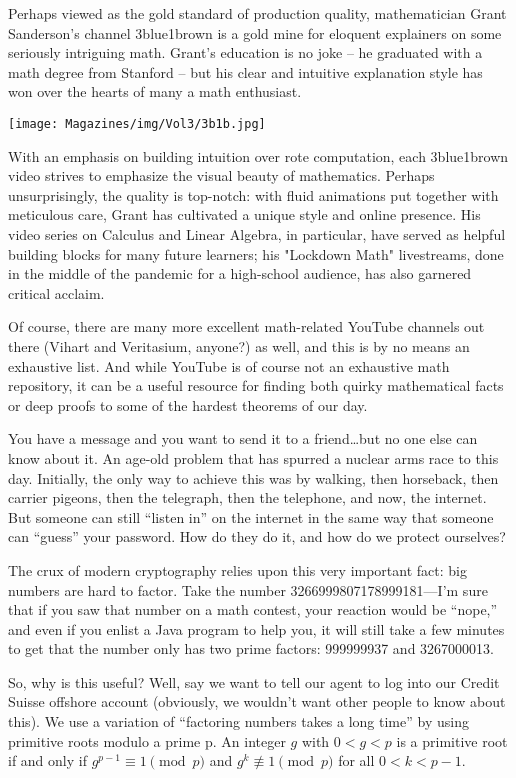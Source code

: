 \documentclass{article}
\begin{document}
\begin{multicols}{3}
Perhaps viewed as the gold standard of production quality, mathematician Grant Sanderson's channel 3blue1brown is a gold mine for eloquent explainers on some seriously intriguing math. Grant's education is no joke -- he graduated with a math degree from Stanford -- but his clear and intuitive explanation style has won over the hearts of many a math enthusiast. 
\begin{center}
\texttt{[image: Magazines/img/Vol3/3b1b.jpg]}
\end{center}
With an emphasis on building intuition over rote computation, each 3blue1brown video strives to emphasize the visual beauty of mathematics. Perhaps unsurprisingly, the quality is top-notch: with fluid animations put together with meticulous care, Grant has cultivated a unique style and online presence. His video series on Calculus and Linear Algebra, in particular, have served as helpful building blocks for many future learners; his "Lockdown Math" livestreams, done in the middle of the pandemic for a high-school audience, has also garnered critical acclaim. 

Of course, there are many more excellent math-related YouTube channels out there (Vihart and Veritasium, anyone?) as well, and this is by no means an exhaustive list. And while YouTube is of course not an exhaustive math repository, it can be a useful resource for finding both quirky mathematical facts or deep proofs to some of the hardest theorems of our day. 
\closearticle

You have a message and you want to send it to a friend…but no one else can know about it. An age-old problem that has spurred a nuclear arms race to this day. Initially, the only way to achieve this was by walking, then horseback, then carrier pigeons, then the telegraph, then the telephone, and now, the internet. But someone can still “listen in” on the internet in the same way that someone can “guess” your password. How do they do it, and how do we protect ourselves?

The crux of modern cryptography relies upon this very important fact: big numbers are hard to factor. Take the number 3266999807178999181—I’m sure that if you saw that number on a math contest, your reaction would be “nope,” and even if you enlist a Java program to help you, it will still take a few minutes to get that the number only has two prime factors: 999999937 and 3267000013. 

So, why is this useful? Well, say we want to tell our agent to log into our Credit Suisse offshore account (obviously, we wouldn't want other people to know about this). We use a variation of “factoring numbers takes a long time” by using primitive roots modulo a prime p. An integer $g$ with $0<g<p$ is a primitive root if and only if $g^{p-1} \equiv 1 \pmod{p}$ and $g^k \not\equiv 1 \pmod{p}$ for all $0 < k < p-1$. 


\end{multicols}
\end{document}
